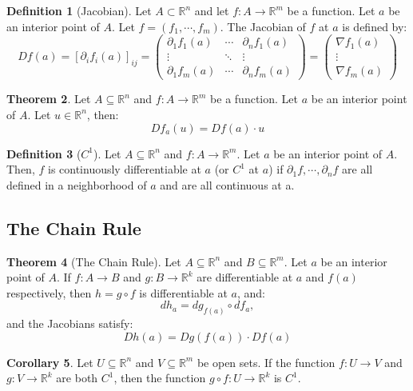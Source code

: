 \documentclass[12pt]{article}
\theoremstyle{definition}
\newtheorem{definition}{Definition}[subsection]
\newtheorem{theorem}[definition]{Theorem}
\newtheorem{corollary}[definition]{Corollary}
\theoremstyle{remark}
\begin{document}
\begin{definition}[Jacobian]
Let $A\subset\mathbb{R}^n$ and let $f:A\to\mathbb{R}^m$ be a function. Let $a$ be an interior point of $A$. Let $f=(f_1,\cdots,f_m)$. The Jacobian of $f$ at $a$ is defined by:
\[
Df(a)=[\partial_if_i(a)]_{ij}=\begin{pmatrix}\partial_1f_1(a)&\cdots&\partial_nf_1(a)\\\vdots&\ddots&\vdots\\\partial_1f_m(a)&\cdots&\partial_nf_m(a)\end{pmatrix}=\begin{pmatrix}\nabla f_1(a)\\\vdots\\\nabla f_m(a)\end{pmatrix}
\]
\end{definition}

\begin{theorem}
Let $A\subseteq\mathbb{R}^n$ and $f:A\to\mathbb{R}^m$ be a function. Let $a$ be an interior point of $A$. Let $u\in\mathbb{R}^n$, then:
\[
Df_a(u)=Df(a)\cdot u
\]
\end{theorem}

\begin{definition}[$C^1$]
Let $A\subseteq\mathbb{R}^n$ and $f:A\to\mathbb{R}^m$. Let $a$ be an interior point of $A$. Then, $f$ is continuously differentiable at $a$ (or $C^1$ at $a$) if $\partial_1f,\cdots,\partial_nf$ are all defined in a neighborhood of $a$ and are all continuous at a.
\end{definition}
\subsection{The Chain Rule}
\begin{theorem}[The Chain Rule]
Let $A\subseteq\mathbb{R}^n$ and $B\subseteq\mathbb{R}^m$. Let $a$ be an interior point of $A$. If $f:A\to B$ and $g:B\to\mathbb{R}^k$ are differentiable at $a$ and $f(a)$ respectively, then $h=g\circ f$ is differentiable at $a$, and:
\[
dh_a=dg_{f(a)}\circ df_a,
\]
and the Jacobians satisfy:
\[
Dh(a)=Dg(f(a))\cdot Df(a)
\]
\end{theorem}

\begin{corollary}
Let $U\subseteq\mathbb{R}^n$ and $V\subseteq\mathbb{R}^m$ be open sets. If the function $f:U\to V$ and $g:V\to \mathbb{R}^k$ are both $C^1$, then the function $g\circ f:U\to\mathbb{R}^k$ is $C^1$.
\end{corollary}
\end{document}
